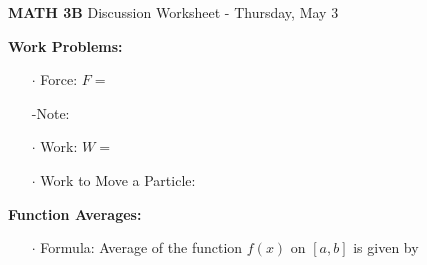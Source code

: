 \documentclass[12pt]{report}
\begin{document}
\begin{center}
\textbf{{\LARGE MATH 3B}  \hfill} Discussion Worksheet - Thursday, May 3\\

\end{center}



\noindent\textbf{Work Problems:}

\begin{itemize}

\item[$\cdot$] Force: $F = $ %

\bigskip

-Note: %

\bigskip\bigskip

\item[$\cdot$] Work: $W = $ %

\bigskip\bigskip

\item[$\cdot$] Work to Move a Particle: %

\bigskip\bigskip

\end{itemize} 

\noindent\textbf{Function Averages:}

\begin{itemize}

\item[$\cdot$] Formula: Average of the function $f(x)$ on $[a,b]$ is given by

\end{itemize}

\bigskip\bigskip
\end{document}

